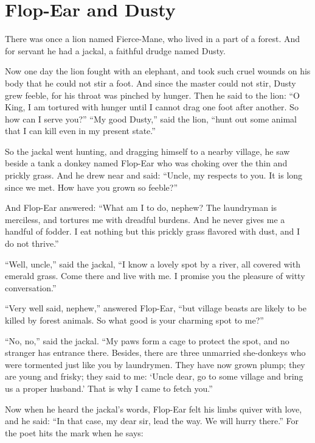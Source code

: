 \documentclass[article, twoside, 14pt]{memoir}
\begin{document}
\chapter{Flop-Ear and Dusty}

\label{s68}

There was once a lion named Fierce-Mane, who lived in a part of a
forest. And for servant he had a jackal, a faithful drudge named
Dusty.

Now one day the lion fought with an elephant, and took such cruel
wounds on his body that he could not stir a foot. And since the
master could not stir, Dusty grew feeble, for his throat was
pinched by hunger. Then he said to the lion:
``O King, I am tortured with hunger until I cannot drag one foot after another. So how can I serve you?''
``My good Dusty,'' said the lion,
``hunt out some animal that I can kill even in my present state.''

So the jackal went hunting, and dragging himself to a nearby
village, he saw beside a tank a donkey named Flop-Ear who was
choking over the thin and prickly grass. And he drew near and said:
``Uncle, my respects to you. It is long since we met. How have you grown so feeble?''

And Flop-Ear answered:
``What am I to do, nephew? The laundryman is merciless, and tortures me with dreadful burdens. And he never gives me a handful of fodder. I eat nothing but this prickly grass flavored with dust, and I do not thrive.''

``Well, uncle,'' said the jackal,
``I know a lovely spot by a river, all covered with emerald grass. Come there and live with me. I promise you the pleasure of witty conversation.''

``Very well said, nephew,'' answered Flop-Ear,
``but village beasts are likely to be killed by forest animals. So what good is your charming spot to me?''

``No, no,'' said the jackal.
``My paws form a cage to protect the spot, and no stranger has entrance there. Besides, there are three unmarried she-donkeys who were tormented just like you by laundrymen. They have now grown plump; they are young and frisky; they said to me: `Uncle dear, go to some village and bring us a proper husband.' That is why I came to fetch you.''

Now when he heard the jackal's words, Flop-Ear felt his limbs
quiver with love, and he said:
``In that case, my dear sir, lead the way. We will hurry there.''
For the poet hits the mark when he says:
\end{document}
